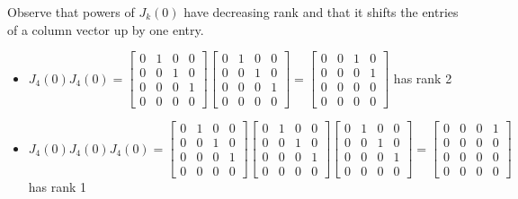 \begin{remark*}
Observe that powers of $J_k(0)$ have decreasing rank and that it shifts the entries of a column vector up by one entry.
\begin{itemize}
    \item $J_4(0) J_4(0) = \begin{bmatrix} 0 & 1 & 0 & 0 \\ 0 & 0 & 1 & 0 \\ 0 & 0 & 0 & 1 \\ 0 & 0 & 0 & 0\end{bmatrix} \begin{bmatrix} 0 & 1 & 0 & 0 \\ 0 & 0 & 1 & 0 \\ 0 & 0 & 0 & 1 \\ 0 & 0 & 0 & 0\end{bmatrix} = \begin{bmatrix} 0 & 0 & 1 & 0 \\ 0 & 0 & 0 & 1 \\ 0 & 0 & 0 & 0 \\ 0 & 0 & 0 & 0\end{bmatrix}$ has rank 2
    \item $J_4(0) J_4(0) J_4(0) = \begin{bmatrix} 0 & 1 & 0 & 0 \\ 0 & 0 & 1 & 0 \\ 0 & 0 & 0 & 1 \\ 0 & 0 & 0 & 0\end{bmatrix} \begin{bmatrix} 0 & 1 & 0 & 0 \\ 0 & 0 & 1 & 0 \\ 0 & 0 & 0 & 1 \\ 0 & 0 & 0 & 0\end{bmatrix} \begin{bmatrix} 0 & 1 & 0 & 0 \\ 0 & 0 & 1 & 0 \\ 0 & 0 & 0 & 1 \\ 0 & 0 & 0 & 0\end{bmatrix} = \begin{bmatrix} 0 & 0 & 0 & 1 \\ 0 & 0 & 0 & 0 \\ 0 & 0 & 0 & 0 \\ 0 & 0 & 0 & 0 \end{bmatrix}$ has rank 1

\end{itemize}
\end{remark*}
